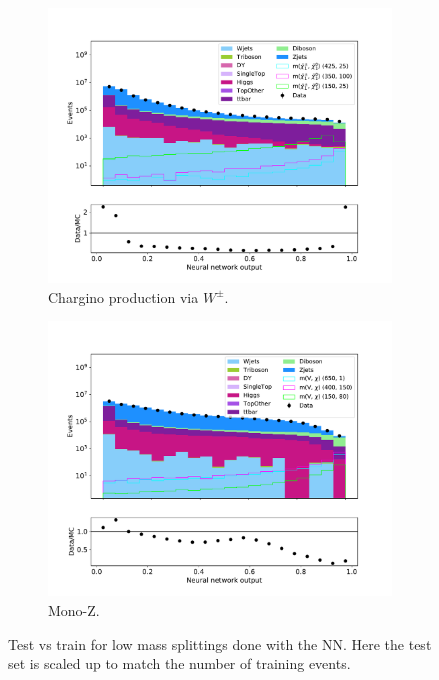 \begin{figure}[H]
\begin{subfigure}[t!]{0.49\textwidth}
        \label{fig:SlepsnuNNLow}
    \end{subfigure}      
    \begin{subfigure}[t!]{0.49\textwidth}
        \includegraphics[width = \textwidth]{Figures/Stacked/stackedplot_NN_Low_level_WW.pdf}
        \caption{Chargino production via $W^\pm$.}
        \label{fig:WWNNLow}
    \end{subfigure}
    \begin{subfigure}[t!]{0.49\textwidth}
        \includegraphics[width = \textwidth]{Figures/Stacked/stackedplot_NN_Low_level_monoZ.pdf}
        \caption{Mono-Z.}
        \label{fig:MonoZNNLow}
    \end{subfigure}
    \caption{Test vs train for low mass splittings done with the NN. Here the test set is scaled up to match the number of training events.}
    \label{fig:AllLowNN}
\end{figure}

